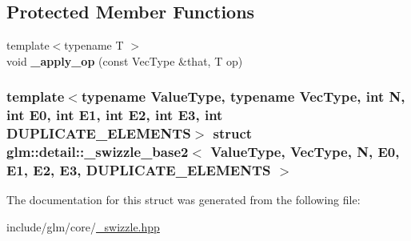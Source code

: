 \subsection*{\-Protected \-Member \-Functions}
\begin{DoxyCompactItemize}
\item 
\hypertarget{structglm_1_1detail_1_1__swizzle__base2_adc355968d70e1f0b34759a8cb78ea6ae}{{\footnotesize template$<$typename T $>$ }\\void {\bfseries \-\_\-apply\-\_\-op} (const \-Vec\-Type \&that, \-T op)}\label{structglm_1_1detail_1_1__swizzle__base2_adc355968d70e1f0b34759a8cb78ea6ae}

\end{DoxyCompactItemize}
\subsubsection*{template$<$typename \-Value\-Type, typename \-Vec\-Type, int \-N, int \-E0, int \-E1, int \-E2, int \-E3, int \-D\-U\-P\-L\-I\-C\-A\-T\-E\-\_\-\-E\-L\-E\-M\-E\-N\-T\-S$>$ struct glm\-::detail\-::\-\_\-swizzle\-\_\-base2$<$ Value\-Type, Vec\-Type, N, E0, E1, E2, E3, D\-U\-P\-L\-I\-C\-A\-T\-E\-\_\-\-E\-L\-E\-M\-E\-N\-T\-S $>$}



\-The documentation for this struct was generated from the following file\-:\begin{DoxyCompactItemize}
\item 
include/glm/core/\hyperlink{__swizzle_8hpp}{\-\_\-swizzle.\-hpp}\end{DoxyCompactItemize}
